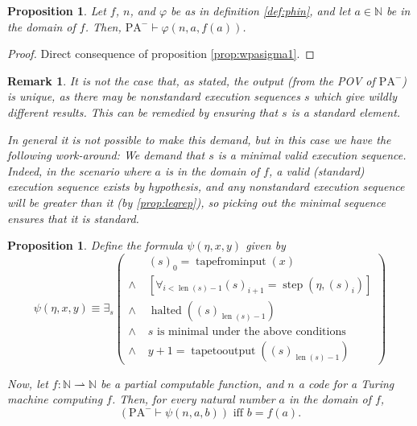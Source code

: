 \documentclass{article}
\newtheorem{prop}[theorem]{Proposition}
\newtheorem{remark}[theorem]{Remark}
\theoremstyle{nonumberplain}
\newtheorem{proof}{Proof}
\newcommand{\N}{\mathbb{N}}
\newcommand{\PA}{\mathrm{PA}}
\newcommand{\WPA}{\PA^-}
\DeclareMathOperator{\step}{step}
\DeclareMathOperator{\tapefrominput}{tapefrominput}
\DeclareMathOperator{\tapetooutput}{tapetooutput}
\DeclareMathOperator{\halted}{halted}
\DeclareMathOperator{\len}{len}
\begin{document}
\begin{prop}
Let $f$, $n$, and $\varphi$ be as in definition \ref{def:phin}, and let $a \in \N$ be in the domain of $f$. Then, $\WPA \vdash \varphi(n,a,f(a))$.
\end{prop}

\begin{proof}
Direct consequence of proposition \ref{prop:wpasigma1}.
\end{proof}

\begin{remark}
It is not the case that, as stated, the output (from the POV of $\WPA$) is unique, as there may be nonstandard execution sequences $s$ which give wildly different results. This can be remedied by ensuring that $s$ is a standard element.

In general it is not possible to make this demand, but in this case we have the following work-around: We demand that $s$ is a minimal valid execution sequence. Indeed, in the scenario where $a$ is in the domain of $f$, a valid (standard) execution sequence exists by hypothesis, and any nonstandard execution sequence will be greater than it (by \ref{prop:leqrep}), so picking out the minimal sequence ensures that it is standard.
\end{remark}

\begin{prop}\label{prop:psin}
Define the formula $\psi(\eta,x,y)$ given by
\begin{equation}
\psi(\eta,x,y) \equiv \exists_s \left(
\begin{aligned}
&(s)_0 = \tapefrominput(x)\\
\land \; &[\forall_{i < \len(s) - 1} (s)_{i+1} = \step(\eta, (s)_i)]\\
\land \; &\halted((s)_{\len(s)-1})\\
\land \; &\text{$s$ is minimal under the above conditions}\\
\land \; &y+1 = \tapetooutput((s)_{\len(s) - 1})
\end{aligned} \right)
\end{equation}

Now, let $f \colon \N \rightharpoonup \N$ be a partial computable function, and $n$ a code for a Turing machine computing $f$. Then, for every natural number $a$ in the domain of $f$,
\begin{equation}
\left( \WPA \vdash \psi(n,a,b) \right) \text{ iff } b = f(a).
\end{equation}
\end{prop}
\end{document}
